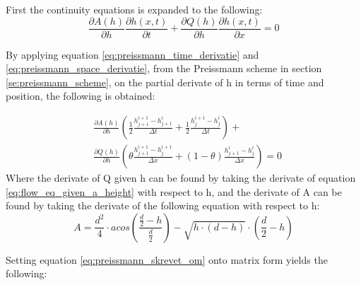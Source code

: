 First the continuity equations is expanded to the following:
\begin{equation}
	\frac{\partial A(h)}{\partial h}\frac{\partial h(x,t)}{\partial t} + \frac{\partial Q(h)}{\partial h}\frac{\partial h(x,t)}{\partial x}=0
\end{equation}

By applying equation \ref{eq:preissmann_time_derivatie} and \ref{eq:preissmann_space_derivatie}, from the Preissmann scheme in section \ref{se:preissmann_scheme}, on the partial derivate of h in terms of time and position, the following is obtained: 

\begin{equation}\label{eq:preissmann_skrevet_om}
\begin{aligned}
	&\frac{\partial A(h)}{\partial h} \left(\frac{1}{2}\frac{h_{j+1}^{i+1}-h_{j+1}^i}{\Delta t} +  \frac{1}{2} \frac{h_{j}^{i+1} - h_j^i}{\Delta t}\right) + \\ &\frac{\partial Q(h)}{\partial h}\left(\theta \frac{h_{j+1}^{i+1}-h_j^{i+1}}{\Delta x}+(1-\theta)\frac{h_{j+1}^i - h_j^i}{\Delta x}\right)=0
\end{aligned}
\end{equation}
Where the derivate of Q given h can be found by taking the derivate of equation \ref{eq:flow_eq_given_a_height} with respect to h, and the derivate of A can be found by taking the derivate of the following equation with respect to h:
\begin{equation}%
	A = \frac {d^2}{4} \cdot acos \left(\frac{\frac{d}{2}-h}{\frac{d}{2}}\right)-\sqrt{h\cdot (d-h)}\cdot  \left(\frac{d}{2}-h\right)
\end{equation}

Setting equation \ref{eq:preissmann_skrevet_om} onto matrix form yields the following:

